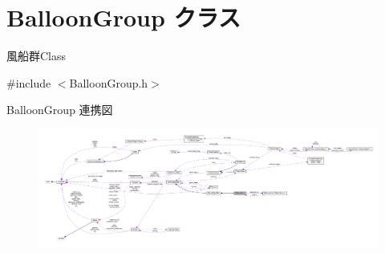 \hypertarget{class_balloon_group}{}\section{Balloon\+Group クラス}
\label{class_balloon_group}


風船群\+Class  




{\ttfamily \#include $<$Balloon\+Group.\+h$>$}



Balloon\+Group 連携図\nopagebreak
\begin{figure}[H]
\begin{center}
\leavevmode
\includegraphics[width=350pt]{class_balloon_group__coll__graph}
\end{center}
\end{figure}
